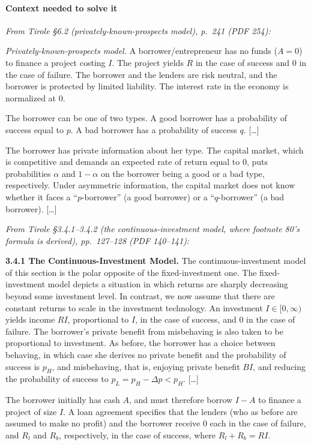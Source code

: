 \documentclass[11pt,a4paper]{article}
\begin{document}
\paragraph{Context needed to solve it}

\emph{From Tirole §6.2 (privately-known-prospects model), p.~241 (PDF 254):}

\emph{Privately-known-prospects model.} A borrower/entrepreneur has no funds (\(A = 0\)) to finance
a project costing \(I\). The project yields \(R\) in the case of success and 0 in the case of
failure. The borrower and the lenders are risk neutral, and the borrower is protected by limited
liability. The interest rate in the economy is normalized at 0.

The borrower can be one of two types. A good borrower has a probability of success equal to \(p\). A
bad borrower has a probability of success \(q\). {[}\ldots{]}

The borrower has private information about her type. The capital market, which is competitive and
demands an expected rate of return equal to 0, puts probabilities \(\alpha\) and \(1 - \alpha\) on
the borrower being a good or a bad type, respectively. Under asymmetric information, the capital
market does not know whether it faces a ``\(p\)-borrower'' (a good borrower) or a ``\(q\)-borrower''
(a bad borrower). {[}\ldots{]}

\emph{From Tirole §3.4.1--3.4.2 (the continuous-investment model, where footnote 80's formula is
derived), pp.~127--128 (PDF 140--141):}

\textbf{3.4.1 The Continuous-Investment Model.} The continuous-investment model of this section is
the polar opposite of the fixed-investment one. The fixed-investment model depicts a situation in
which returns are sharply decreasing beyond some investment level. In contrast, we now assume that
there are constant returns to scale in the investment technology. An investment
\(I \in [0, \infty)\) yields income \(RI\), proportional to \(I\), in the case of success, and 0 in
the case of failure. The borrower's private benefit from misbehaving is also taken to be
proportional to investment. As before, the borrower has a choice between behaving, in which case she
derives no private benefit and the probability of success is \(p_H\), and misbehaving, that is,
enjoying private benefit \(BI\), and reducing the probability of success to
\(p_L = p_H - \Delta p < p_H\). {[}\ldots{]}

The borrower initially has cash \(A\), and must therefore borrow \(I - A\) to finance a project of
size \(I\). A loan agreement specifies that the lenders (who as before are assumed to make no
profit) and the borrower receive 0 each in the case of failure, and \(R_l\) and \(R_b\),
respectively, in the case of success, where \(R_l + R_b = RI\).
\end{document}
